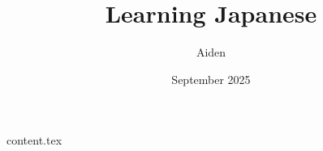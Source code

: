 \documentclass{book}
\begin{document}
\setcounter{tocdepth}{2}

\frontmatter

\title{Learning Japanese}
\author{Aiden}
\date{September 2025}
\maketitle

\tableofcontents

\mainmatter

{content.tex}

\backmatter
\end{document}
